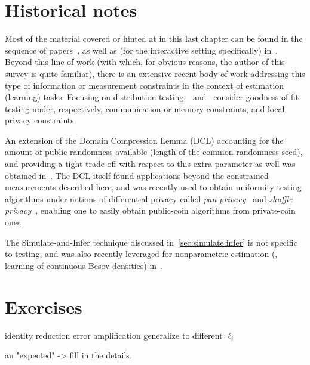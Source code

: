 \section{Historical notes}
  \label{sec:constrained:notes}
Most of the material covered or hinted at in this last chapter can be found in the sequence of papers~\citet{AcharyaCT:IT1,AcharyaCT19b,AcharyaCFST21}, as well as (for the interactive setting specifically) in~\citet{AcharyaCLST21,AcharyaCST20}. Beyond this line of work (with which, for obvious reasons, the author of this survey is quite familiar), there is an extensive recent body of work addressing this type of information or measurement constraints in the context of estimation (learning) tasks. Focusing on distribution testing,~\citet{DiakonikolasGKR19} and~\citet{AminJM20,BerrettB20} consider goodness-of-fit testing under, respectively, communication or memory constraints, and local privacy constraints.

An extension of the Domain Compression Lemma (DCL) accounting for the amount of public randomness available (length of the common randomness seed), and providing a tight trade-off with respect to this extra parameter as well was obtained in~\citet{AcharyaCHST20}. The DCL itself found applications beyond the constrained measurements described here, and was recently used to obtain uniformity testing algorithms under notions of differential privacy called \emph{pan-privacy}~\citep{AminJM20} and \emph{shuffle privacy}~\citep{BalcerCJM21,CL:22}, enabling one to easily obtain public-coin algorithms from private-coin ones.

The Simulate-and-Infer technique discussed in~\cref{sec:simulate:infer} is not specific to testing, and was also recently leveraged for nonparametric estimation (\ie, learning of continuous Besov densities) in~\citet{ACST:21b}.
\section{Exercises}
identity reduction
error amplification
generalize to different $\ell_i$

an "expected" -> fill in the details.